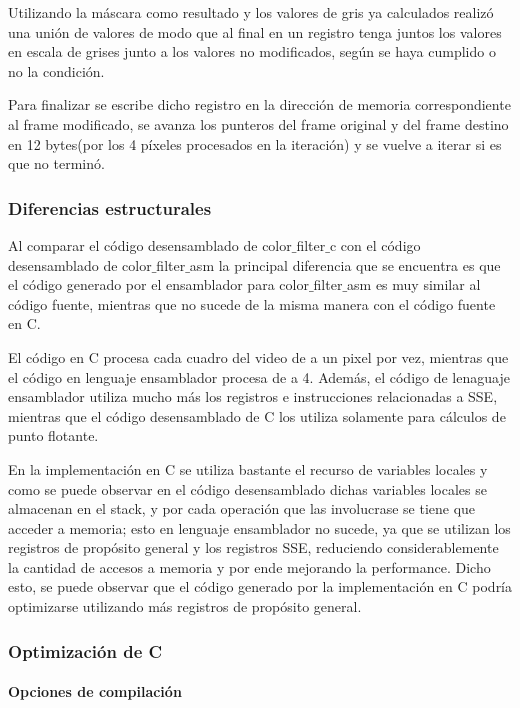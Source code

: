 	Utilizando la m\'ascara como resultado y los valores de gris ya calculados realiz\'o una uni\'on de valores de modo que al final en un registro tenga juntos los valores en escala de grises junto a los valores no modificados, seg\'un se haya cumplido o no la condici\'on.
	
	
	Para finalizar se escribe dicho registro en la direcci\'on de memoria correspondiente al frame modificado, se avanza los punteros del frame original y del frame destino en 12 bytes(por los 4 p\'ixeles procesados en la iteraci\'on) y se vuelve a iterar si es que no termin\'o.

	
	\subsubsection{Diferencias estructurales}
	
		Al comparar el c\'odigo desensamblado de color$\_$filter$\_$c con el código desensamblado de color$\_$filter$\_$asm la principal diferencia que se encuentra es que el código generado por el ensamblador para color$\_$filter$\_$asm es muy similar al código fuente, mientras que no sucede de la misma manera con el código fuente en C.

		El código en C procesa cada cuadro del video de a un pixel por vez, mientras que el código en lenguaje ensamblador procesa de a 4. Además, el código de lenaguaje ensamblador utiliza mucho más los registros e instrucciones relacionadas a SSE, mientras que el código desensamblado de C los utiliza solamente para cálculos de punto flotante.

		En la implementación en C se utiliza bastante el recurso de variables locales y como se puede observar en el código desensamblado dichas variables locales se almacenan en el stack, y por cada operación que las involucrase se tiene que acceder a memoria; esto en lenguaje ensamblador no sucede, ya que se utilizan los registros de propósito general y los registros SSE, reduciendo considerablemente la cantidad de accesos a memoria y por ende mejorando la performance. Dicho esto, se puede observar que el código generado por la implementación en C podría optimizarse utilizando más registros de propósito general.
	
	\subsubsection{Optimizaci\'on de C}
	
	\paragraph{Opciones de compilaci\'on}
	
